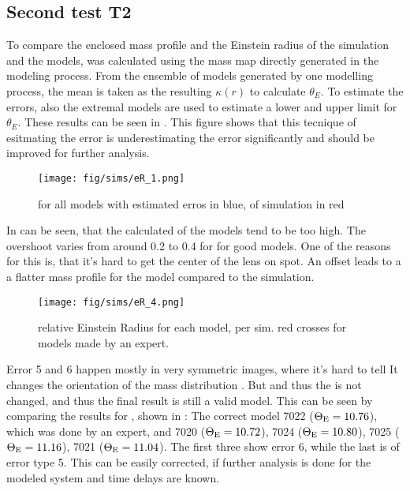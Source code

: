 \subsection{Second test T2} \label{sec:results.2}

To compare the enclosed mass profile and the Einstein radius of the simulation and the models, \kenc was calculated using the mass map \kap[x,y] directly generated in the modeling process.
From the ensemble of models generated by one modelling process, the mean is taken as the resulting $\kappa(r)$ to calculate $\theta_E$.
To estimate the errors, also the extremal models are used to estimate a lower and upper limit for $\theta_E$.
These results can be seen in .
This figure shows that this tecnique of esitmating the error is underestimating the error significantly and should be improved for further analysis.

\begin{figure}[htbp]
  \centering
    \texttt{[image: fig/sims/eR\_1.png]}
  \caption{\tEr \gEr for all models with estimated erros in blue, \gEr of simulation in red}
  \label{fig:eR_all_models}
\end{figure}

In  can be seen, that the calculated \tEr \gEr of the models tend to be too high.
The overshoot varies from around 0.2 to 0.4 for for good models.
One of the reasons for this is, that it's hard to get the center of the lens on spot.
An offset leads to a a flatter mass profile for the model compared to the simulation.



\begin{figure}[htbp]
  \centering
    \texttt{[image: fig/sims/eR\_4.png]}
  \caption{relative Einstein Radius for each model, per sim. red crosses for models made by an expert.}
  \label{fig:eR_per_sim}
\end{figure}


Error 5 and 6 happen mostly in very symmetric images, where it's hard to tell
It changes the orientation of the mass distribution \kap[x,y].
But \kenc and thus the \tEr \gEr is not changed, and thus the final result is still a valid model.
This can be seen by comparing the results for , shown in : 
The correct model 7022 ($\Theta_\text{E}=10.76$), which was done by an expert, and
7020 ($\Theta_\text{E}=10.72$),
7024 ($\Theta_\text{E}=10.80$),
7025 ($\Theta_\text{E}=11.16$),
7021 ($\Theta_\text{E}=11.04$).
The first three show error 6, while the last is of error type 5.
This can be easily corrected, if further analysis is done for the modeled system and time delays are known.

